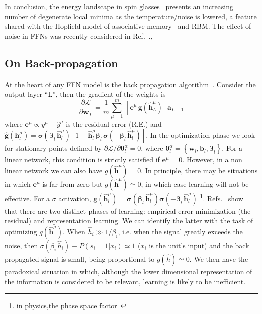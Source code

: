 \documentclass{article}
\begin{document}
In conclusion, the energy landscape in spin glasses~\cite{parisi2, giardina} presents an increasing number of degenerate local minima as the temperature/noise is lowered, a feature shared with the Hopfield model of associative memory~\cite{amit} and RBM. The effect of noise in FFNs was recently considered in Ref.~\cite{pratik}.,%

\subsection{On Back-propagation} \label{sub:back}
At the heart of any FFN model is the back propagation algorithm~\cite{hertz, bishop}. Consider the output layer ``L'', then the gradient of the weights is
%
\begin{equation} \label{eq:gradsL}
\frac{\partial \mathscr{L}}{\partial \mathbf{w}_L } =  \frac{1}{m} \sum_{\mu=1}^m \, \left[ \mathbf{e}^{\mu} \, \mathbf{g}(\hat{\mathbf{h}}^{\mu} _L) \right]  \mathbf{a}_{L-1}
 \end{equation}
%
where $\mathbf{e}^{\mu}\propto y^{\mu} - \hat{y}^{\mu}$ is the residual error (R.E.) and $\hat{\mathbf{g}}(\mathbf{h}^{\mu}_l) =  \boldsymbol{\sigma}(\boldsymbol{\beta}_l \, \hat{\mathbf{h}}^{\mu}_l)[ 1 + \hat{\mathbf{h}}^{\mu}_l \boldsymbol{\beta}_l \, \boldsymbol{\sigma}(-\boldsymbol{\beta}_l \, \hat{\mathbf{h}}^{\mu}_l) ] $. In the optimization phase we look for stationary points defined by $\partial \mathscr{L}/\partial \boldsymbol{\theta}^{\alpha}_l=0$, where $\boldsymbol{\theta}^{\alpha}_l = \left\{ \mathbf{w}_l, \mathbf{b}_l, \boldsymbol{\beta}_l \right\} $. For a linear network, this condition is  strictly satisfied if $ \mathbf{e}^{\mu}=0$. However, in a non linear network we can also have $g(\hat{\mathbf{h}}^{\mu})=0$. In principle, there may be situations in which $\mathbf{e}^{\mu}$ is far from zero but $g(\hat{\mathbf{h}}^{\mu}) \simeq 0$, in which case learning will not be effective. For a $\sigma$ activation, $\mathbf{g}(\hat{\mathbf{h}}^{\mu}_l) = \boldsymbol{\sigma}(\boldsymbol{\beta}_l \, \hat{\mathbf{h}}^{\mu}_l)\boldsymbol{\sigma}(-\boldsymbol{\beta}_l \, \hat{\mathbf{h}}^{\mu}_l)$ \footnote{in physics,the phase space factor~\cite{roberto}}.%
 Refs.~\cite{tishby1, tishby2} show that there are two distinct phases of learning: empirical error minimization (the residual) and representation learning. We can identify the latter with the task of optimizing $g(\hat{\mathbf{h}}^{\mu})$. When $\hat{h}_i \gg 1/\beta_i$, i.e. when the signal greatly exceeds the noise, then $\sigma( \beta_i \,\hat{ h}_i) \equiv P(s_i=1| \bar{x}_i)  \simeq 1$ ($\bar{x}_i$ is the unit's input) and the back propagated signal is small, being proportional to $g(\hat{h} ) \simeq 0$. We then have the paradoxical situation in which, although the lower dimensional representation of the information is considered to be relevant, learning is likely to be inefficient.
\end{document}
